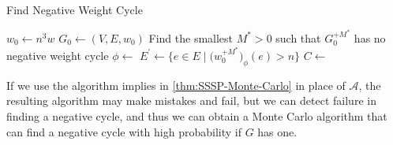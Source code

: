\begin{algorithm}[H]\label{algo:find-negative-cyele}
	\DontPrintSemicolon{}
	\caption{Find Negative Weight Cycle}
	\BlankLine

	\(w_0 \gets n^3 w\)\;
	\(G_0 \gets (V, E, w_0)\)\;
	Find the smallest \(M^{\ast} > 0\) such that \(G_0^{+M^{\ast} }\) has no negative weight cycle
	\(\phi \gets \)
	\(E^{\prime} \gets \{ e \in E \mid \big(w_0^{+ M^{\ast}}\big)_{\phi } (e) > n \} \)\;
	\(C \gets\)\;
	\;
\end{algorithm}

If we use the algorithm implies in \autoref{thm:SSSP-Monte-Carlo} in place of \(\mathcal{A} \), the resulting algorithm may make mistakes and fail, but we can detect failure in finding a negative cycle, and thus we can obtain a Monte Carlo algorithm that can find a negative cycle with high probability if \(G\) has one.